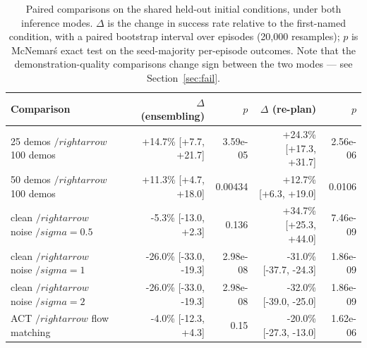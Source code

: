 \begin{table}[t]
\centering
\small
\begin{tabular}{llrrrr}
\toprule
Comparison & & $\Delta$ (ensembling) & $p$ & $\Delta$ (re-plan) & $p$ \\
\midrule
25 demos $/rightarrow$ 100 demos & & +14.7\% [+7.7, +21.7] & 3.59e-05 & +24.3\% [+17.3, +31.7] & 2.56e-06 \\
50 demos $/rightarrow$ 100 demos & & +11.3\% [+4.7, +18.0] & 0.00434 & +12.7\% [+6.3, +19.0] & 0.0106 \\
clean $/rightarrow$ noise $/sigma{=}0.5$ & & -5.3\% [-13.0, +2.3] & 0.136 & +34.7\% [+25.3, +44.0] & 7.46e-09 \\
clean $/rightarrow$ noise $/sigma{=}1$ & & -26.0\% [-33.0, -19.3] & 2.98e-08 & -31.0\% [-37.7, -24.3] & 1.86e-09 \\
clean $/rightarrow$ noise $/sigma{=}2$ & & -26.0\% [-33.0, -19.3] & 2.98e-08 & -32.0\% [-39.0, -25.0] & 1.86e-09 \\
ACT $/rightarrow$ flow matching & & -4.0\% [-12.3, +4.3] & 0.15 & -20.0\% [-27.3, -13.0] & 1.62e-06 \\
\bottomrule
\end{tabular}
\caption{Paired comparisons on the shared held-out initial conditions, under both inference modes. $\Delta$ is the change in success rate relative to the first-named condition, with a paired bootstrap interval over episodes (20{,}000 resamples); $p$ is McNemar\'s exact test on the seed-majority per-episode outcomes. Note that the demonstration-quality comparisons change sign between the two modes --- see Section~\ref{sec:fail}.}
\label{tab:paired}
\end{table}
